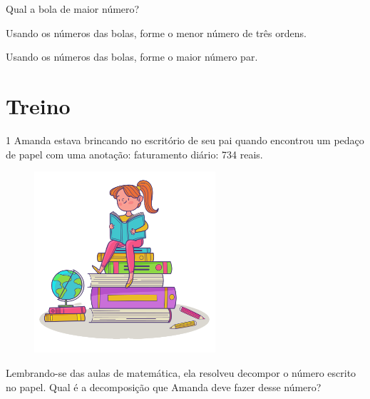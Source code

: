 \begin{escolha}\enlargethispage{3\baselineskip}
\item Qual a bola de maior número?\\

\item Usando os números das bolas, forme o menor número de três ordens. \\

\item Usando os números das bolas, forme o maior número par.\\

\end{escolha}


\pagebreak

\section*{Treino}

\num{1} Amanda estava brincando no escritório de seu pai quando
encontrou um pedaço de papel com uma anotação: faturamento diário: 734 reais.

\begin{figure}[htpb!]
\centering
\includegraphics[width=0.6\textwidth]{./media/image6b.png}
\end{figure}

Lembrando-se das aulas de matemática, ela resolveu decompor o número escrito
no papel. Qual é a decomposição que Amanda deve fazer desse
número?


